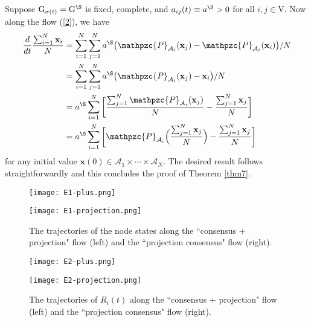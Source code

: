 \documentclass[a4paper, 11pt]{article}
\begin{document}
Suppose $\mathrm{G}_{\sigma(t)}=\mathrm{G}^\S$ is fixed, complete, and $a_{ij}(t) \equiv a^\S >0$ for all $i,j\in\mathrm{V}$. Now along the flow (\ref{2}), we have
\begin{align}
\frac{d}{dt}\frac{\sum_{i=1}^N \mathbf{x}_i}{N} &=\sum_{i=1}^N  \sum_{j=1}^Na^\S\big(\mathpzc{P}_{\mathcal{A}_i}(\mathbf{x}_j)-\mathpzc{P}_{\mathcal{A}_i}(\mathbf{x}_i)\big)/N \nonumber\\
&=\sum_{i=1}^N  \sum_{j=1}^Na^\S\big(\mathpzc{P}_{\mathcal{A}_i}(\mathbf{x}_j)-\mathbf{x}_i\big)/N \nonumber\\
&=a^\S  \sum_{i=1}^N \bigg[\frac{\sum_{j=1}^N \mathpzc{P}_{\mathcal{A}_i}(\mathbf{x}_j)}{N}   -  \frac{\sum_{j=1}^N \mathbf{x}_j} {N}\bigg] \nonumber\\
&=a^\S  \sum_{i=1}^N \bigg[\mathpzc{P}_{\mathcal{A}_i}\Big(\frac{ \sum_{j=1}^N\mathbf{x}_j}{N}\Big)   -\frac{\sum_{j=1}^N \mathbf{x}_j}{N}\bigg]
\end{align}
for any  initial value  $\mathbf{x}(0)\in \mathcal{A}_1\times\cdots \times \mathcal{A}_N$.  The desired result follows straightforwardly and this concludes the proof of Theorem \ref{thm7}.

\begin{figure*}
\begin{minipage}[t]{0.5\linewidth}
\centering
\texttt{[image: E1-plus.png]}
\end{minipage}\begin{minipage}[t]{0.5\linewidth}
\centering
\texttt{[image: E1-projection.png]}
\end{minipage}
\caption{The trajectories of the node states along the ``consensus + projection" flow (left) and the ``projection consensus" flow (right).}
\label{fig:fig1}
\end{figure*}

\begin{figure*}
\begin{minipage}[t]{0.5\linewidth}
\centering
\texttt{[image: E2-plus.png]}
\end{minipage}\begin{minipage}[t]{0.5\linewidth}
\centering
\texttt{[image: E2-projection.png]}
\end{minipage}
\caption{The trajectories of  $R_i(t)$  along the ``consensus + projection" flow (left) and the ``projection consensus" flow (right).}
\label{fig:fig2}
\end{figure*}
\end{document}
